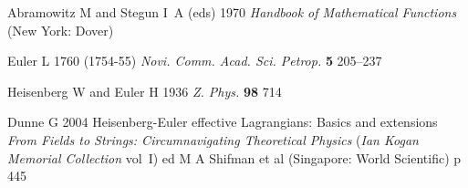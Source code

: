 \documentclass[12pt]{iopart}
\begin{document}
\begin{thebibliography}{10}
Abramowitz M and Stegun I~A (eds) 1970 {\em Handbook of {M}athematical
  {F}unctions\/} (New York: Dover)

Euler L 1760 (1754-55) {\em Novi. Comm. Acad. Sci. Petrop.\/} {\bf 5} 205--237

Heisenberg W and Euler H 1936 {\em Z. Phys.\/} {\bf 98} 714

Dunne G 2004 Heisenberg-Euler effective Lagrangians: Basics and extensions {\em
  From Fields to Strings: Circumnavigating Theoretical Physics\/} ({\em Ian
  Kogan Memorial Collection\/} vol~I) ed {M A Shifman et al} (Singapore: World Scientific)
  p 445

\end{thebibliography}
\end{document}
